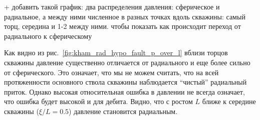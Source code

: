 \documentclass{article}
\begin{document}
{\color{red} + добавить такой график: два распределения давления: сферическое и радиальное, а между ними численное в разных точках вдоль скважины: самый торц, середина и 1-2 между ними. чтобы показать как происходит переход от радиального к сферическому}

Как видно из рис.~\ref{fig:kham_rad_hypo_fault_p_over_l} вблизи торцов скважины давление существенно отличается от радиального и еще более сильно от сферического.
Это означает, что мы не можем считать, что на всей протяженности основного ствола скважины наблюдается ``чистый'' радиальный приток.
Однако высокая относительная ошибка в давлении не всегда означает, что ошибка будет высокой и для дебита.
Видно, что с ростом $L$ ближе к середине скважины ($\xi / L = 0.5$) давление становится радиальным.

\begin{figure}[h!]
\centering
\begin{subfigure}{0.3\textwidth}

\caption{}
\label{eq:kham_rad_hypo_fault_q_l_H005_L05}
\end{subfigure}
\hfill
\begin{subfigure}{0.3\textwidth}

\caption{}
\label{eq:kham_rad_hypo_fault_q_l_H005_L1}
\end{subfigure}
\hfill
\begin{subfigure}{0.3\textwidth}

\caption{}
\label{eq:kham_rad_hypo_fault_q_l_H005_L5}
\end{subfigure}

\begin{subfigure}{0.3\textwidth}

\caption{}
\label{eq:kham_rad_hypo_fault_q_l_H015_L05}
\end{subfigure}
\hfill
\begin{subfigure}{0.3\textwidth}

\caption{}
\label{eq:kham_rad_hypo_fault_q_l_H015_L1}
\end{subfigure}
\hfill
\begin{subfigure}{0.3\textwidth}

\caption{}
\label{eq:kham_rad_hypo_fault_q_l_H015_L5}
\end{subfigure}


\end{figure}
\end{document}
